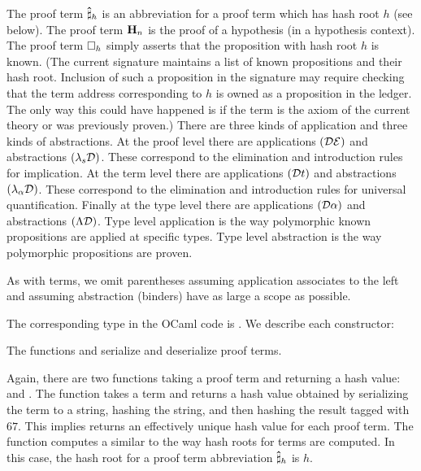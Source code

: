 The proof term $\mathbf{\hat\sharp}_{h}$
is an abbreviation for a proof term which has hash root $h$
(see {} below).
The proof term $\mathbf{H}_{n}$
is the proof of a hypothesis (in a hypothesis context).
The proof term $\Box_{h}$
simply asserts that the proposition with hash root
$h$ is known. (The current signature maintains a list
of known propositions and their hash root.
Inclusion of such a proposition in the signature may require
checking that the term address corresponding to $h$
is owned as a proposition in the ledger. The only
way this could have happened is if the term is the axiom
of the current theory or was previously proven.)
There are three kinds of application and three kinds of abstractions.
At the proof level there are applications
$(\mathcal{D}\mathcal{E})$
and abstractions
$(\lambda_s \mathcal{D})$.
These correspond to the elimination and introduction
rules for implication.
At the term level there are applications
$(\mathcal{D} t)$
and abstractions
$(\lambda_\alpha\mathcal{D})$.
These correspond to the elimination and introduction
rules for universal quantification.
Finally at the type level there are applications
$(\mathcal{D}\alpha)$
and abstractions
$(\Lambda\mathcal{D})$.
Type level application is the way polymorphic known propositions
are applied at specific types.
Type level abstraction is the way polymorphic propositions are
proven.

As with terms, we omit parentheses assuming application
associates to the left and
assuming abstraction (binders) have as large a scope as possible.

The corresponding type in the OCaml code is {}.
We describe each constructor:

The functions {} and {} serialize and deserialize proof terms.

Again, there are two functions taking a proof term
and returning a hash value:
{}
and
{}.
The function {} takes a term and returns a hash value obtained by serializing the term
to a string, hashing the string, and then hashing the result tagged with $67$.
This implies {} returns an effectively unique hash value for each proof term.
The function {} computes a {}
similar to the way hash roots for terms are computed.
In this case, the hash root for a proof term abbreviation
$\mathbf{\hat\sharp}_{h}$ is $h$.


